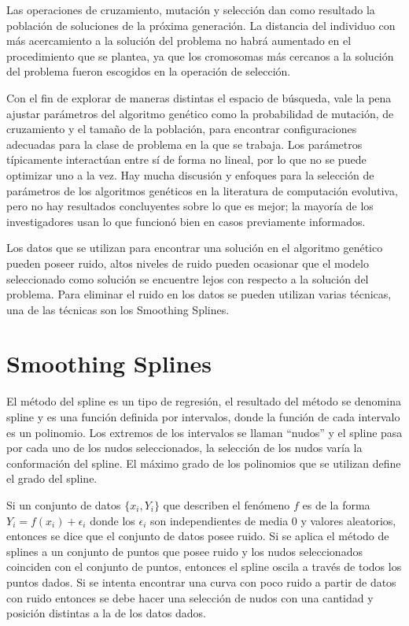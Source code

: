 Las operaciones de cruzamiento, mutación y selección dan como resultado la población de soluciones de la próxima generación. La distancia del individuo con más acercamiento a la solución del problema no habrá aumentado en el procedimiento que se plantea, ya que los cromosomas más cercanos a la solución del problema fueron escogidos en la operación de selección.

Con el fin de explorar de maneras distintas el espacio de búsqueda, vale la pena ajustar parámetros del algoritmo genético como la probabilidad de mutación, de cruzamiento y el tamaño de la población, para encontrar configuraciones adecuadas para la clase de problema en la que se trabaja. Los parámetros típicamente interactúan entre sí de forma no lineal, por lo que no se puede optimizar uno a la vez. Hay mucha discusión y enfoques para la selección de parámetros de los algoritmos genéticos en la literatura de computación evolutiva, pero no hay resultados concluyentes sobre lo que es mejor; la mayoría de los investigadores usan lo que funcionó bien en casos previamente informados. \cite{mitchell1998introduction}

Los datos que se utilizan para encontrar una solución en el algoritmo genético pueden poseer ruido, altos niveles de ruido pueden ocasionar que el modelo seleccionado como solución se encuentre lejos con respecto a la solución del problema. Para eliminar el ruido en los datos se pueden utilizan varias técnicas, una de las técnicas son los Smoothing Splines.

\section{Smoothing Splines}

El método del spline es un tipo de regresión, el resultado del método se denomina spline y es una función definida por intervalos, donde la función de cada intervalo es un polinomio. Los extremos de los intervalos se llaman ``nudos'' y el spline pasa por cada uno de los nudos seleccionados, la selección de los nudos varía la conformación del spline. El máximo grado de los polinomios que se utilizan define el grado del spline. \cite{ahlberg1967theory}

Si un conjunto de datos $\{x_i, Y_i\}$ que describen el fenómeno $f$ es de la forma $Y_i = f(x_i) + \epsilon _i$ donde los $\epsilon _i$ son independientes de media 0 y valores aleatorios, entonces se dice que el conjunto de datos posee ruido. Si se aplica el método de splines a un conjunto de puntos que posee ruido y los nudos seleccionados coinciden con el conjunto de puntos, entonces el spline oscila a través de todos los puntos dados. Si se intenta encontrar una curva con poco ruido a partir de datos con ruido entonces se debe hacer una selección de nudos con una cantidad y posición distintas a la de los datos dados.

